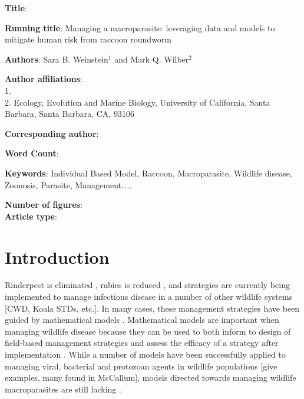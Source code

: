 \documentclass[11pt]{article}
\begin{document}
\noindent
\textbf{Title}{}: 

\bigskip

\noindent
\textbf{Running title}: Managing a macroparasite: leveraging data and models to mitigate human risk from raccoon roundworm

\bigskip

\noindent
\textbf{Authors}: Sara B. Weinstein$^1$ and Mark Q. Wilber$^2$

\bigskip

\noindent
\textbf{Author affiliations}: \\
1. \\
2. Ecology, Evolution and Marine Biology, University of California, Santa Barbara, Santa Barbara, CA, 93106 \\

\bigskip

\noindent
\textbf{Corresponding author}:

\bigskip

\noindent
\textbf{Word Count}: 

\bigskip

\noindent
\textbf{Keywords}: Individual Based Model, Raccoon, Macroparasite,
Wildlife disease, Zoonosis, Parasite, Management\ldots{}..

\bigskip

\noindent
\textbf{Number of figures}:  \\
\textbf{Article type}: 

\clearpage

\section{Introduction}

Rinderpest is eliminated \citep{Roeder2011}, rabies is reduced \citep{Freuling2013}, and strategies are currently being implemented to manage infectious disease in a number of other wildlife systems [CWD, Koala STDs, etc.]. In many cases, these management strategies have been
guided by mathematical models \citep[e.g.][]{Restif2012,McCallum2017}.  Mathematical models are important when managing wildlife disease because they can be used to both inform to design of field-based management strategies and assess the efficacy of a strategy after implementation  \citep{Restif2012}.  While a number of models have been successfully applied to managing
viral, bacterial and protozoan agents in wildlife populations [give examples, many found in McCallum], models directed
towards managing wildlife macroparasites are still lacking \citep[][, but see X X X for macroparasite models in livestock]{McCallum2017}.
\end{document}
